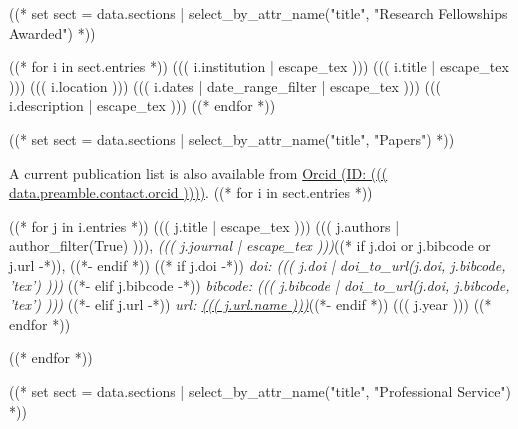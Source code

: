 \documentclass[10pt, letterpaper]{awesome-cv}
\begin{document}
((* set sect = data.sections | select_by_attr_name("title", "Research Fellowships Awarded") *))
\begin{cventries}
((* for i in sect.entries *))
\cventry
  {((( i.institution | escape_tex )))}
  {((( i.title | escape_tex )))}
  {((( i.location )))}
  {((( i.dates | date_range_filter | escape_tex )))}
  {((( i.description | escape_tex )))}
((* endfor *))
\end{cventries}

((* set  sect = data.sections | select_by_attr_name("title", "Papers") *))

A current publication list is also available from
\href{https://orcid.org/((( data.preamble.contact.orcid )))}
     {Orcid (ID: ((( data.preamble.contact.orcid ))))}.
((* for i in sect.entries *))
\begin{cvhonors}
  ((* for j in i.entries *))
  \cvhonor
    {((( j.title | escape_tex )))}
    {((( j.authors | author_filter(True) ))),
     {\slshape\color{awesome} ((( j.journal | escape_tex )))}((* if j.doi or j.bibcode or j.url -*)), ((*-  endif *))
     ((* if j.doi -*))
     {\slshape\color{graytext} doi: ((( j.doi | doi_to_url(j.doi, j.bibcode, 'tex') )))}
     ((*- elif j.bibcode -*))
     {\slshape\color{graytext} bibcode: ((( j.bibcode | doi_to_url(j.doi, j.bibcode, 'tex') )))}
     ((*- elif j.url -*))
     {\slshape\color{graytext} url: \href{((( j.url.link )))}{((( j.url.name )))}}((*- endif *))}
    {}
    {((( j.year )))}
  ((* endfor *))
\end{cvhonors}
((* endfor *))

((* set sect = data.sections | select_by_attr_name("title", "Professional Service") *))
\end{document}
